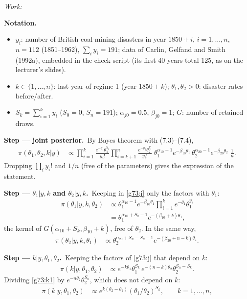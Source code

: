 \documentclass[11pt,a4paper]{article}
\newif\ifsolucoes
\newcommand{\espacoresol}{4.5cm}   %
\newenvironment{notacao}{\par\smallskip\noindent\textbf{Notation.}\begin{itemize}[leftmargin=1.4em,topsep=1pt,itemsep=0pt]\small}{\end{itemize}}
\newcommand{\resolespaco}{\ifsolucoes\else\par\textit{Work:}\vspace{\espacoresol}\par\fi}
\newcommand{\passo}[2]{\par\smallskip\noindent\textbf{Step --- #1.}~#2}
\begin{document}
\resolespaco
\begin{sol}
\begin{notacao}
\item $y_i$: number of British coal-mining disasters in year $1850+i$, $i=1,\ldots,n$, $n=112$ (1851--1962), $\sum_iy_i=191$; data of Carlin, Gelfand and Smith (1992a), embedded in the check script (its first 40 years total 125, as on the lecturer's slides).
\item $k\in\{1,\ldots,n\}$: last year of regime 1 (year $1850+k$); $\theta_1,\theta_2>0$: disaster rates before/after.
\item $S_k=\sum_{i=1}^ky_i$ ($S_0=0$, $S_n=191$); $\alpha_{j0}=0.5$, $\beta_{j0}=1$; $G$: number of retained draws.
\end{notacao}
\passo{joint posterior}{By Bayes theorem with (7.3)--(7.4),
\begin{align}
\pi(\theta_1,\theta_2,k|y)&\propto\prod_{i=1}^k\frac{e^{-\theta_1}\theta_1^{y_i}}{y_i!}\prod_{i=k+1}^n\frac{e^{-\theta_2}\theta_2^{y_i}}{y_i!}\;\theta_1^{\alpha_{10}-1}e^{-\beta_{10}\theta_1}\,\theta_2^{\alpha_{20}-1}e^{-\beta_{20}\theta_2}\;\frac1n.\label{g73:j}
\end{align}
Dropping $\prod_iy_i!$ and $1/n$ (free of the parameters) gives the expression of the statement.}
\passo{$\theta_1|y,k$ and $\theta_2|y,k$}{Keeping in \eqref{g73:j} only the factors with $\theta_1$:
\begin{align}
\pi(\theta_1|y,k,\theta_2)&\propto\theta_1^{\alpha_{10}-1}e^{-\beta_{10}\theta_1}\prod_{i=1}^ke^{-\theta_1}\theta_1^{y_i}\label{g73:t1a}\\
&=\theta_1^{\alpha_{10}+S_k-1}e^{-(\beta_{10}+k)\theta_1},\label{g73:t1}
\end{align}
the kernel of $G(\alpha_{10}+S_k,\beta_{10}+k)$, free of $\theta_2$. In the same way,
\begin{align}
\pi(\theta_2|y,k,\theta_1)&\propto\theta_2^{\alpha_{20}+S_n-S_k-1}e^{-(\beta_{20}+n-k)\theta_2}.\label{g73:t2}
\end{align}}
\passo{$k|y,\theta_1,\theta_2$}{Keeping the factors of \eqref{g73:j} that depend on $k$:
\begin{align}
\pi(k|y,\theta_1,\theta_2)&\propto e^{-k\theta_1}\theta_1^{S_k}\,e^{-(n-k)\theta_2}\theta_2^{S_n-S_k}.\label{g73:k1}
\end{align}
Dividing \eqref{g73:k1} by $e^{-n\theta_2}\theta_2^{S_n}$, which does not depend on $k$:
\begin{align}
\pi(k|y,\theta_1,\theta_2)&\propto e^{k(\theta_2-\theta_1)}(\theta_1/\theta_2)^{S_k},\qquad k=1,\ldots,n,\label{g73:k2}

\end{align}}
\end{sol}
\end{document}
